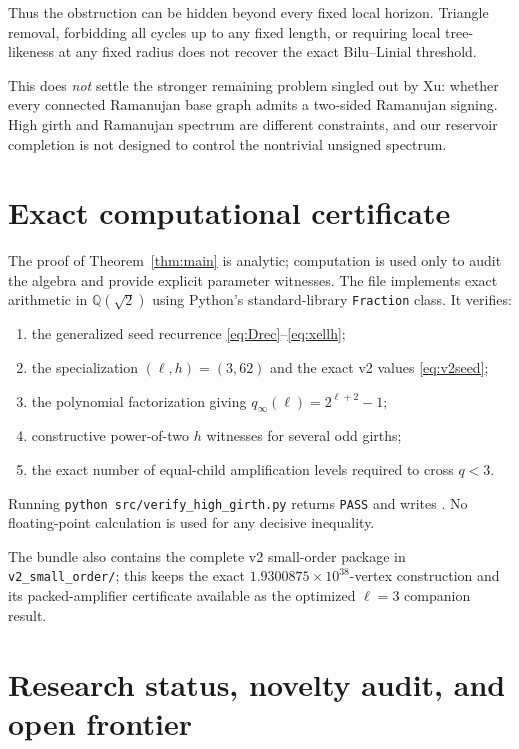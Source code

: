 \documentclass[11pt]{article}
\begin{document}
Thus the obstruction can be hidden beyond every fixed local horizon.  Triangle removal, forbidding all cycles up to any fixed length, or requiring local tree-likeness at any fixed radius does not recover the exact Bilu--Linial threshold.

This does \emph{not} settle the stronger remaining problem singled out by Xu: whether every connected Ramanujan base graph admits a two-sided Ramanujan signing.  High girth and Ramanujan spectrum are different constraints, and our reservoir completion is not designed to control the nontrivial unsigned spectrum.

\section{Exact computational certificate}

The proof of Theorem~\ref{thm:main} is analytic; computation is used only to audit the algebra and provide explicit parameter witnesses.  The file
implements exact arithmetic in $\mathbb Q(\sqrt2)$ using Python's standard-library \texttt{Fraction} class.  It verifies:

\begin{enumerate}
\item the generalized seed recurrence \eqref{eq:Drec}--\eqref{eq:xellh};
\item the specialization $(\ell,h)=(3,62)$ and the exact v2 values \eqref{eq:v2seed};
\item the polynomial factorization giving $q_\infty(\ell)=2^{\ell+2}-1$;
\item constructive power-of-two $h$ witnesses for several odd girths;
\item the exact number of equal-child amplification levels required to cross $q<3$.
\end{enumerate}

Running \texttt{python src/verify\_high\_girth.py} returns \texttt{PASS} and writes .  No floating-point calculation is used for any decisive inequality.

The bundle also contains the complete v2 small-order package in \texttt{v2\_small\_order/}; this keeps the exact $1.9300875\times10^{38}$-vertex construction and its packed-amplifier certificate available as the optimized $\ell=3$ companion result.

\section{Research status, novelty audit, and open frontier}
\end{document}
